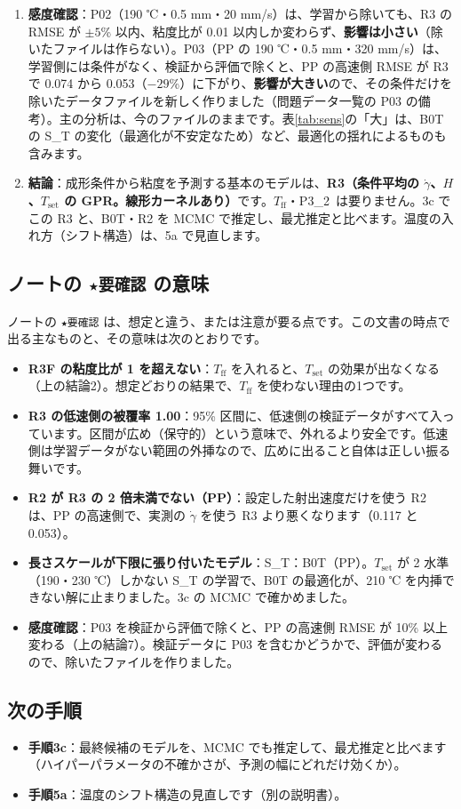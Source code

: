 \documentclass[paper=a4paper,fontsize=10.5pt,line_length=44zw,number_of_lines=38]{jlreq}
\newcommand{\gd}{\dot{\gamma}}
\newcommand{\PII}{P3\_2}
\newcommand{\Tff}{T_{\mathrm{ff}}}
\newcommand{\Tset}{T_{\mathrm{set}}}
\newenvironment{points}{\begin{itemize}[label=$\triangleright$,leftmargin=1.5\zw,itemsep=0.3ex,topsep=0.5ex,parsep=0pt]}{\end{itemize}}
\newcommand{\pt}[1]{\item \textbf{#1}：}
\begin{document}
\begin{enumerate}[itemsep=0.6ex,topsep=0.6ex]
\item \textbf{感度確認}：P02（190 ℃・0.5 mm・20 mm/s）は、学習から除いても、R3 の RMSE が $\pm 5$\% 以内、粘度比が 0.01 以内しか変わらず、\textbf{影響は小さい}（除いたファイルは作らない）。P03（PP の 190 ℃・0.5 mm・320 mm/s）は、学習側には条件がなく、検証から評価で除くと、PP の高速側 RMSE が R3 で 0.074 から 0.053（$-29$\%）に下がり、\textbf{影響が大きい}ので、その条件だけを除いたデータファイルを新しく作りました（問題データ一覧の P03 の備考）。主の分析は、今のファイルのままです。表\ref{tab:sens}の「大」は、B0T の S\_T の変化（最適化が不安定なため）など、最適化の揺れによるものも含みます。
\item \textbf{結論}：成形条件から粘度を予測する基本のモデルは、\textbf{R3（条件平均の $\gd$、$H$、$\Tset$ の GPR。線形カーネルあり）}です。$\Tff$・\PII\ は要りません。3c でこの R3 と、B0T・R2 を MCMC で推定し、最尤推定と比べます。温度の入れ方（シフト構造）は、5a で見直します。
\end{enumerate}

\subsection{ノートの \texttt{★要確認} の意味}
ノートの \texttt{★要確認} は、想定と違う、または注意が要る点です。この文書の時点で出る主なものと、その意味は次のとおりです。
\begin{points}
\pt{R3F の粘度比が 1 を超えない}$\Tff$ を入れると、$\Tset$ の効果が出なくなる（上の結論2）。想定どおりの結果で、$\Tff$ を使わない理由の1つです。
\pt{R3 の低速側の被覆率 1.00}95\% 区間に、低速側の検証データがすべて入っています。区間が広め（保守的）という意味で、外れるより安全です。低速側は学習データがない範囲の外挿なので、広めに出ること自体は正しい振る舞いです。
\pt{R2 が R3 の 2 倍未満でない（PP）}設定した射出速度だけを使う R2 は、PP の高速側で、実測の $\gd$ を使う R3 より悪くなります（0.117 と 0.053）。
\pt{長さスケールが下限に張り付いたモデル}S\_T：B0T（PP）。$\Tset$ が 2 水準（190・230 ℃）しかない S\_T の学習で、B0T の最適化が、210 ℃ を内挿できない解に止まりました。3c の MCMC で確かめました。
\pt{感度確認}P03 を検証から評価で除くと、PP の高速側 RMSE が 10\% 以上変わる（上の結論7）。検証データに P03 を含むかどうかで、評価が変わるので、除いたファイルを作りました。
\end{points}

\subsection{次の手順}
\begin{points}
\pt{手順3c}最終候補のモデルを、MCMC でも推定して、最尤推定と比べます（ハイパーパラメータの不確かさが、予測の幅にどれだけ効くか）。
\pt{手順5a}温度のシフト構造の見直しです（別の説明書）。
\end{points}
\end{document}
